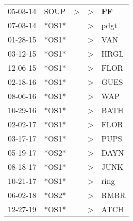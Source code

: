 \begin{supertabular}{p{0.07\textwidth}p{0.06\textwidth}p{0.02\textwidth}p{0.02\textwidth}p{0.06\textwidth}}
 05-03-14\textsuperscript{} &  SOUP\textsuperscript{} &  \textgreater &     \textgreater &    \textbf{FF\textsuperscript{}} \\
 07-03-14\textsuperscript{} &                   *OS1* &               &     \textgreater &           pdgt\textsuperscript{} \\
 01-28-15\textsuperscript{} &                   *OS1* &               &     \textgreater &            VAN\textsuperscript{} \\
 03-12-15\textsuperscript{} &                   *OS1* &               &     \textgreater &           HRGL\textsuperscript{} \\
 12-06-15\textsuperscript{} &                   *OS1* &               &     \textgreater &           FLOR\textsuperscript{} \\
 02-18-16\textsuperscript{} &                   *OS1* &               &     \textgreater &           GUES\textsuperscript{} \\
 08-06-16\textsuperscript{} &                   *OS1* &               &     \textgreater &            WAP\textsuperscript{} \\
 10-29-16\textsuperscript{} &                   *OS1* &               &     \textgreater &           BATH\textsuperscript{} \\
 02-02-17\textsuperscript{} &                   *OS1* &               &     \textgreater &           FLOR\textsuperscript{} \\
 03-17-17\textsuperscript{} &                   *OS1* &               &     \textgreater &           PUPS\textsuperscript{} \\
 05-19-17\textsuperscript{} &                   *OS2* &               &     \textgreater &           DAYN\textsuperscript{} \\
 08-18-17\textsuperscript{} &                   *OS1* &               &     \textgreater &           JUNK\textsuperscript{} \\
 10-21-17\textsuperscript{} &                   *OS1* &               &     \textgreater &           ring\textsuperscript{} \\
 06-02-18\textsuperscript{} &                   *OS2* &               &     \textgreater &           RMBR\textsuperscript{} \\
 12-27-19\textsuperscript{} &                   *OS1* &               &     \textgreater &           ATCH\textsuperscript{} \\
\end{supertabular}
